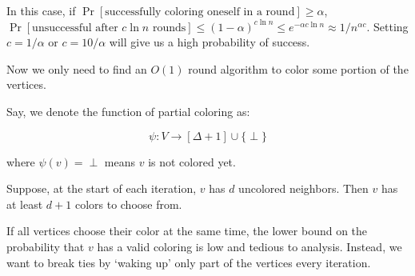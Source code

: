 In this case, if $\Pr[\text{successfully coloring oneself in a round}]\geq \alpha$, $\Pr[\text{unsuccessful after }c\ln n\text{ rounds}]\leq (1-\alpha)^{c\ln n} \leq e^{-\alpha c \ln n} \approx 1/n^{\alpha c}$. Setting $c = 1/\alpha$ or $c = 10/\alpha$ will give us a high probability of success.

Now we only need to find an $O(1)$ round algorithm to color some portion of the vertices.

Say, we denote the function of partial coloring as:

\[ \psi: V \to [\Delta + 1] \cup \{\perp\} \]

where $\psi(v) = \perp$ means $v$ is not colored yet.

Suppose, at the start of each iteration, $v$ has $d$ uncolored neighbors. Then $v$ has at least $d+1$ colors to choose from.

If all vertices choose their color at the same time, the lower bound on the probability that $v$ has a valid coloring is low and tedious to analysis. Instead, we want to break ties by `waking up' only part of the vertices every iteration.

\begin{algorithm}
	\caption{Randomized $(\Delta + 1)$-Coloring Algorithm} \label{alg:rand-delta-plus-1-coloring}
\end{algorithm}

